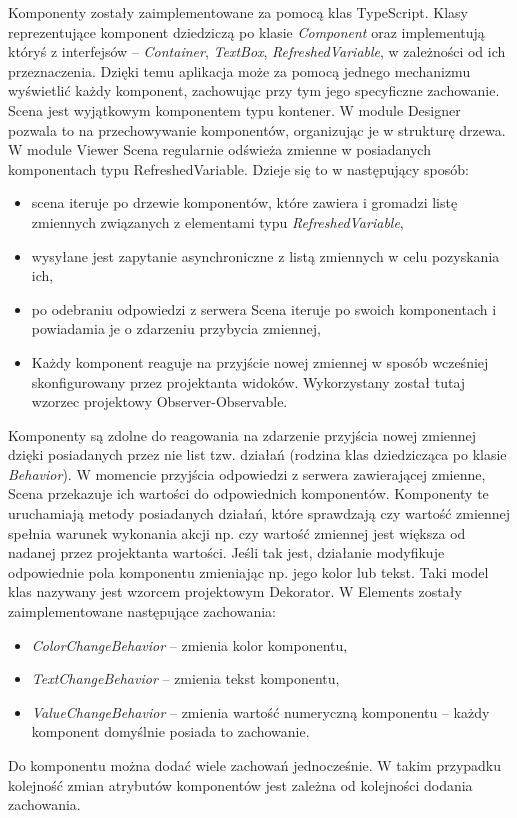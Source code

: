Komponenty zostały zaimplementowane za pomocą klas TypeScript. Klasy reprezentujące komponent dziedziczą po klasie \textit{Component} oraz implementują któryś z interfejsów -- \textit{Container}, \textit{TextBox}, \textit{RefreshedVariable}, w zależności od ich przeznaczenia. Dzięki temu aplikacja może za pomocą jednego mechanizmu wyświetlić każdy komponent, zachowując przy tym jego specyficzne zachowanie. Scena jest wyjątkowym komponentem typu kontener. W module Designer pozwala to na przechowywanie komponentów, organizując je w strukturę drzewa. W module Viewer Scena regularnie odświeża zmienne w posiadanych komponentach typu RefreshedVariable. Dzieje się to w następujący sposób:
\begin{itemize}
\item scena iteruje po drzewie komponentów, które zawiera i gromadzi listę zmiennych związanych z elementami typu \textit{RefreshedVariable},
\item wysyłane jest zapytanie asynchroniczne z listą zmiennych w celu pozyskania ich,
\item po odebraniu odpowiedzi z serwera Scena iteruje po swoich komponentach i powiadamia je o zdarzeniu przybycia zmiennej,
\item Każdy komponent reaguje na przyjście nowej zmiennej w sposób wcześniej skonfigurowany przez projektanta widoków. Wykorzystany został tutaj wzorzec projektowy Observer-Observable.
\end{itemize}

Komponenty są zdolne do reagowania na zdarzenie przyjścia nowej zmiennej dzięki posiadanych przez nie list tzw. działań (rodzina klas dziedzicząca po klasie \textit{Behavior}). W momencie przyjścia odpowiedzi z serwera zawierającej zmienne, Scena przekazuje ich wartości do odpowiednich komponentów. Komponenty te uruchamiają metody posiadanych działań, które sprawdzają czy wartość zmiennej spełnia warunek wykonania akcji np. czy wartość zmiennej jest większa od nadanej przez projektanta wartości. Jeśli tak jest, działanie modyfikuje odpowiednie pola komponentu zmieniając np. jego kolor lub tekst. Taki model klas nazywany jest wzorcem projektowym Dekorator. 
W Elements zostały zaimplementowane następujące zachowania:
\begin{itemize}
\item \textit{ColorChangeBehavior} -- zmienia kolor komponentu,
\item \textit{TextChangeBehavior} -- zmienia tekst komponentu,
\item \textit{ValueChangeBehavior} -- zmienia wartość numeryczną komponentu -- każdy komponent domyślnie posiada to zachowanie.
\end{itemize}
Do komponentu można dodać wiele zachowań jednocześnie. W takim przypadku kolejność zmian atrybutów komponentów jest zależna od kolejności dodania zachowania.

